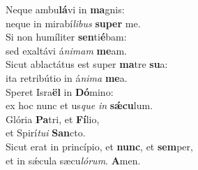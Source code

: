 \evenverse Neque ambu\textbf{lá}vi in \textbf{ma}gnis:~\*\\
\evenverse neque in mirabí\textit{li}\textit{bus} \textbf{su}\textbf{per} me.\\
\oddverse Si non humíliter \textbf{sen}ti\textbf{é}bam:~\*\\
\oddverse sed exaltávi á\textit{ni}\textit{mam} \textbf{me}am.\\
\evenverse Sicut ablactátus est super \textbf{ma}tre \textbf{su}a:~\*\\
\evenverse ita retribútio in á\textit{ni}\textit{ma} \textbf{me}a.\\
\oddverse Speret Isra\textbf{ël} in \textbf{Dó}mino:~\*\\
\oddverse ex hoc nunc et us\textit{que} \textit{in} \textbf{sǽ}\textbf{cu}lum.\\
\evenverse Glória \textbf{Pa}tri, et \textbf{Fí}lio,~\*\\
\evenverse et Spirí\textit{tu}\textit{i} \textbf{San}cto.\\
\oddverse Sicut erat in princípio, et \textbf{nunc}, et \textbf{sem}per,~\*\\
\oddverse et in sǽcula sæcu\textit{ló}\textit{rum}. \textbf{A}men.\\
